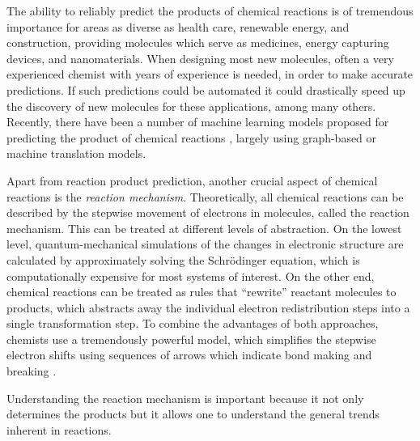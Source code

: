 
The ability to reliably predict the products of chemical reactions is of tremendous importance for areas as diverse as health care, renewable energy, and construction, providing molecules which serve as medicines, energy capturing devices, and nanomaterials. 
When designing most new molecules, often a very experienced chemist with years of experience is needed, in order to make accurate predictions. 
If such predictions could be automated it could drastically speed up the discovery of new molecules for these applications, among many others. Recently, there have been a number of machine learning models proposed for predicting the product of chemical reactions \cite{coley2017prediction,jin2017predicting,neural-symbolic,schwaller2017found,wei2016neural,zhang2005structure}, largely using graph-based or machine translation models. 

Apart from reaction product prediction, another crucial aspect of chemical reactions is the \emph{reaction mechanism}. Theoretically, all chemical reactions can be described by the stepwise movement of electrons in molecules, called the reaction mechanism.
This can be treated at different levels of abstraction. On the lowest level, quantum-mechanical simulations of the  changes in electronic structure are calculated by approximately solving the Schrödinger equation, which is computationally expensive for most systems of interest. 
On the other end, chemical reactions can be treated as rules that ``rewrite'' reactant molecules to products, which abstracts away the individual electron redistribution steps into a single transformation step. 
To combine the advantages of both approaches, chemists use a tremendously powerful model, which simplifies the stepwise electron shifts using sequences of arrows which indicate bond making and breaking \cite{herges1994organizing}. 

Understanding the reaction mechanism is important because it not only determines the products but it allows one to understand the general trends inherent in reactions.



